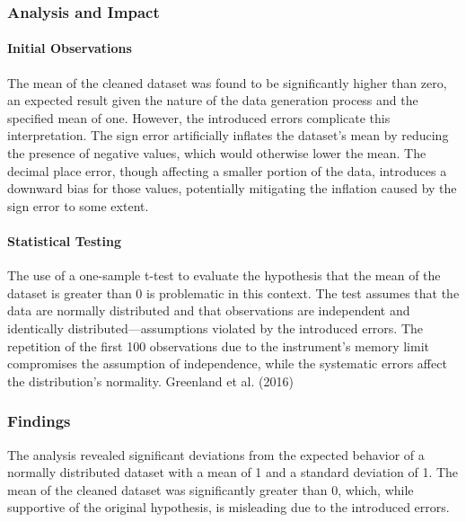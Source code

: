 \documentclass[
  letterpaper,
  DIV=11,
  numbers=noendperiod]{scrartcl}
\let\oldparagraph\paragraph
\renewcommand{\paragraph}[1]{\oldparagraph{#1}\mbox{}}
\begin{document}
\subsubsection{\texorpdfstring{\textbf{Analysis and
Impact}}{Analysis and Impact}}\label{analysis-and-impact}

\paragraph{Initial Observations}\label{initial-observations}

The mean of the cleaned dataset was found to be significantly higher
than zero, an expected result given the nature of the data generation
process and the specified mean of one. However, the introduced errors
complicate this interpretation. The sign error artificially inflates the
dataset's mean by reducing the presence of negative values, which would
otherwise lower the mean. The decimal place error, though affecting a
smaller portion of the data, introduces a downward bias for those
values, potentially mitigating the inflation caused by the sign error to
some extent.

\paragraph{Statistical Testing}\label{statistical-testing}

The use of a one-sample t-test to evaluate the hypothesis that the mean
of the dataset is greater than 0 is problematic in this context. The
test assumes that the data are normally distributed and that
observations are independent and identically distributed---assumptions
violated by the introduced errors. The repetition of the first 100
observations due to the instrument's memory limit compromises the
assumption of independence, while the systematic errors affect the
distribution's normality. Greenland et al. (2016)

\subsubsection{\texorpdfstring{\textbf{Findings}}{Findings}}\label{findings}

The analysis revealed significant deviations from the expected behavior
of a normally distributed dataset with a mean of 1 and a standard
deviation of 1. The mean of the cleaned dataset was significantly
greater than 0, which, while supportive of the original hypothesis, is
misleading due to the introduced errors.
\end{document}
